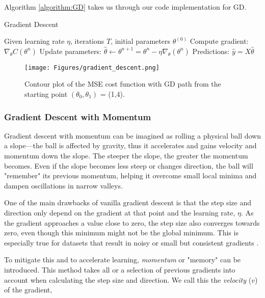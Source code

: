 \documentclass[amssymb,twocolumn,aps]{revtex4}
\begin{document}
Algorithm \ref{algorithm:GD} takes us through our code implementation for GD.

\begin{algorithm}[H]
    \caption{Gradient Descent}
    \label{algorithm:GD}
    \begin{algorithmic}[1]
        \State Given learning rate $\eta$, iterations $T$, initial parameters $\theta^{(0)}$
        \State Compute gradient: $\nabla_\theta C(\theta^n)$
        \State Update parameters: $\hat{\theta} \gets \theta^{n+1} = \theta^n - \eta\nabla_\theta(\theta^n)$
        \EndFor
        \State Predictions: $\hat{y} = X \hat{\theta}$
    \end{algorithmic}
\end{algorithm}


\begin{figure}[H]
    \centering
    \texttt{[image: Figures/gradient\_descent.png]}
    \caption{Contour plot of the MSE cost function with GD path from the starting point $(\theta_0, \theta_1)$ = (1,4).}
    \label{fig:gd}
\end{figure}



\subsubsection{Gradient Descent with Momentum}

Gradient descent with momentum can be imagined as rolling a physical ball down a slope—the ball is affected by gravity, thus it accelerates and gains velocity and momentum down the slope. The steeper the slope, the greater the momentum becomes. Even if the slope becomes less steep or changes direction, the ball will "remember" its previous momentum, helping it overcome small local minima and dampen oscillations in narrow valleys.

One of the main drawbacks of vanilla gradient descent is that the step size and direction only depend on the gradient at that point and the learning rate, $\eta$. As the gradient approaches a value close to zero, the step size also converges towards zero, even though this minimum might not be the global minimum. This is especially true for datasets that result in noisy or small but consistent gradients \cite{Goodfellow-et-al-2016}.

To mitigate this and to accelerate learning, \textit{momentum} or "memory" can be introduced. This method takes all or a selection of previous gradients into account when calculating the step size and direction. We call this the \textit{velocity} ($v$) of the gradient,
\end{document}
